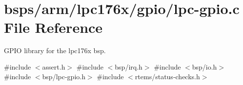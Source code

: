 \hypertarget{lpc-gpio_8c}{}\section{bsps/arm/lpc176x/gpio/lpc-\/gpio.c File Reference}
\label{lpc-gpio_8c}


G\+P\+IO library for the lpc176x bsp.  


{\ttfamily \#include $<$assert.\+h$>$}\newline
{\ttfamily \#include $<$bsp/irq.\+h$>$}\newline
{\ttfamily \#include $<$bsp/io.\+h$>$}\newline
{\ttfamily \#include $<$bsp/lpc-\/gpio.\+h$>$}\newline
{\ttfamily \#include $<$rtems/status-\/checks.\+h$>$}\newline
